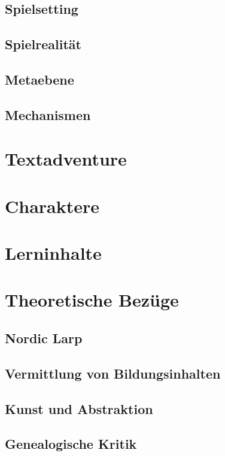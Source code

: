 \documentclass[a4paper, 12pt]{scrartcl}
\begin{document}
    \subsection{Spielsetting}
    \subsection{Spielrealität}
    \subsection{Metaebene}
    \subsection{Mechanismen}

    \section{Textadventure}

    \section{Charaktere}

    \section{Lerninhalte}

    \section{Theoretische Bezüge}
    \subsection{Nordic Larp} \label{nordic-larp}
    \subsection{Vermittlung von Bildungsinhalten}
    \subsection{Kunst und Abstraktion} \label{kunst-abstraktion}
    \subsection{Genealogische Kritik} \label{genealogische-kritik}
\end{document}
